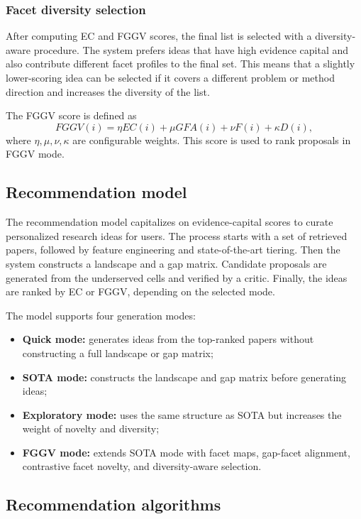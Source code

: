 \documentclass[preprint,12pt]{elsarticle}
\begin{document}
\subsubsection{Facet diversity selection}

After computing EC and FGGV scores, the final list is selected with a diversity-aware procedure. The system prefers ideas that have high evidence capital and also contribute different facet profiles to the final set. This means that a slightly lower-scoring idea can be selected if it covers a different problem or method direction and increases the diversity of the list.

The FGGV score is defined as
\begin{equation}
  FGGV(i) = \eta EC(i) + \mu GFA(i) + \nu F(i) + \kappa D(i),
\end{equation}
where $\eta,\mu,\nu,\kappa$ are configurable weights. This score is used to rank proposals in FGGV mode.

\subsection{Recommendation model}

The recommendation model capitalizes on evidence-capital scores to curate personalized research ideas for users. The process starts with a set of retrieved papers, followed by feature engineering and state-of-the-art tiering. Then the system constructs a landscape and a gap matrix. Candidate proposals are generated from the underserved cells and verified by a critic. Finally, the ideas are ranked by EC or FGGV, depending on the selected mode.

The model supports four generation modes:
\begin{itemize}
  \item \textbf{Quick mode:} generates ideas from the top-ranked papers without constructing a full landscape or gap matrix;
  \item \textbf{SOTA mode:} constructs the landscape and gap matrix before generating ideas;
  \item \textbf{Exploratory mode:} uses the same structure as SOTA but increases the weight of novelty and diversity;
  \item \textbf{FGGV mode:} extends SOTA mode with facet maps, gap-facet alignment, contrastive facet novelty, and diversity-aware selection.
\end{itemize}

\subsection{Recommendation algorithms}
\end{document}
